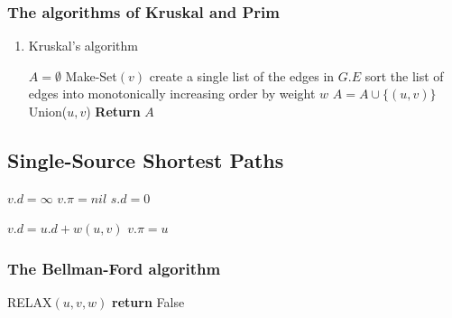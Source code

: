 \documentclass[11pt]{article}
\begin{document}
\subsubsection{The algorithms of Kruskal and Prim}
\label{sec:org6718153}
\begin{enumerate}
\item Kruskal's algorithm
\label{sec:orgb693735}
\begin{algorithmic}[1]
\State \(A=\emptyset\)
    \State Make-Set\((v)\)
\EndFor
\State create a single list of the edges in \(G.E\)
\State sort the list of edges into monotonically increasing order by weight \(w\)
        \State \(A=A\cup\{(u,v)\}\)
        \State Union(\(u,v\))
    \EndIf
\EndFor
\State \textbf{Return} \(A\)
\EndProcedure
\end{algorithmic}
\end{enumerate}

\subsection{Single-Source Shortest Paths}
\label{sec:org4296c50}
\begin{algorithmic}[1]
    \State \(v.d=\infty\)
    \State \(v.\pi=nil\)
\EndFor
\State \(s.d=0\)
\EndProcedure
\end{algorithmic}

\begin{algorithmic}[1]
    \State \(v.d=u.d+w(u,v)\)
    \State \(v.\pi=u\)
\EndIf
\EndProcedure
\end{algorithmic}

\subsubsection{The Bellman-Ford algorithm}
\label{sec:org5089956}
\begin{algorithmic}[1]
            \State RELAX\((u,v,w)\)
        \EndFor
    \EndFor
            \State \textbf{return }False
        \EndIf
    \EndFor
\EndProcedure
\end{algorithmic}
\end{document}
